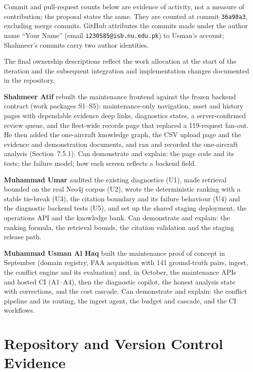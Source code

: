 Commit and pull-request counts below are evidence of activity, not a measure of contribution; the proposal states the same. They are counted at commit \texttt{36a98a3}, excluding merge commits. GitHub attributes the commits made under the author name ``Your Name'' (email \texttt{i230585@isb.nu.edu.pk}) to Usman's account; Shahmeer's commits carry two author identities.



The final ownership descriptions reflect the work allocation at the start of the iteration and the subsequent integration and implementation changes documented in the repository.

\textbf{Shahmeer Atif} rebuilt the maintenance frontend against the frozen backend contract (work packages S1--S5): maintenance-only navigation, asset and history pages with dependable evidence deep links, diagnostics states, a server-confirmed review queue, and the fleet-wide records page that replaced a 119-request fan-out. He then added the one-aircraft knowledge graph, the CSV upload page and the evidence and demonstration documents, and ran and recorded the one-aircraft analysis (Section~7.5.1). Can demonstrate and explain: the page code and its tests; the failure model; how each screen reflects a backend field.

\textbf{Muhammad Umar} audited the existing diagnostics (U1), made retrieval bounded on the real Neo4j corpus (U2), wrote the deterministic ranking with a stable tie-break (U3), the citation boundary and its failure behaviour (U4) and the diagnostic backend tests (U5), and set up the shared staging deployment, the operations API and the knowledge bank. Can demonstrate and explain: the ranking formula, the retrieval bounds, the citation validation and the staging release path.

\textbf{Muhammad Usman Al Haq} built the maintenance proof of concept in September (domain registry, FAA acquisition with 141 ground-truth pairs, ingest, the conflict engine and its evaluation) and, in October, the maintenance APIs and hosted CI (A1--A4), then the diagnostic copilot, the honest analysis state with corrections, and the cost cascade. Can demonstrate and explain: the conflict pipeline and its routing, the ingest agent, the budget and cascade, and the CI workflows.

\section{Repository and Version Control Evidence}


